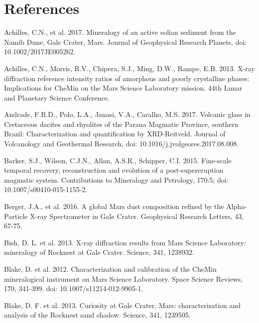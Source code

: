\documentclass[review]{elsarticle}
\newcommand{\changed}{\color{blue}}
\begin{document}
\section*{References}
\begin{thebibliography}{99}


Achilles, C.N., et al. 2017. Mineralogy of an active eolian sediment from the Namib Dune, Gale Crater, Mars. Journal of Geophysical Research Planets, doi: 10.1002/2017JE005262.

Achilles, C.N., Morris, R.V., Chipera, S.J., Ming, D.W., Rampe, E.B. 2013. X-ray diffraction reference intensity ratios of amorphous and poorly crystalline phases: Implications for CheMin on the Mars Science Laboratory mission. 44th Lunar and Planetary Science Conference.

{\changed 
{}
Andrade, F.R.D., Polo, L.A., Janasi, V.A., Caralho, M.S. 2017. Volcanic glass in Cretaceous dacites and rhyolites of the Parana Magmatic Province, southern Brazil: Characterization and quantification by XRD-Reitveld. Journal of Volcanology and Geothermal Research, doi: 10.1016/j.jvolgeores.2017.08.008.
}

Barker, S.J., Wilson, C.J.N., Allan, A.S.R., Schipper, C.I. 2015. Fine-scale temporal recovery, reconstruction and evolution of a post-supereruption magmatic system. Contributions to Mineralogy and Petrology, 170:5; doi: 10.1007/s00410-015-1155-2.

Berger, J.A., et al. 2016. A global Mars dust composition refined by the Alpha-Particle X-ray Spectrometer in Gale Crater. Geophysical Research Letters, 43, 67-75.

Bish, D. L. et al. 2013. X-ray diffraction results from Mars Science Laboratory: mineralogy of Rocknest at Gale Crater. Science, 341, 1238932.

{\changed 
{}
Blake, D. et al. 2012. Characterization and calibration of the CheMin mineralogical instrument on Mars Science Laboratory. Space Science Reviews, 170, 341-399. doi: 10.1007/s11214-012-9905-1.
}

Blake, D. F. et al. 2013. Curiosity at Gale Crater, Mars: characterization and analysis of the Rocknest sand shadow. Science, 341, 1239505.


\end{thebibliography}
\end{document}
